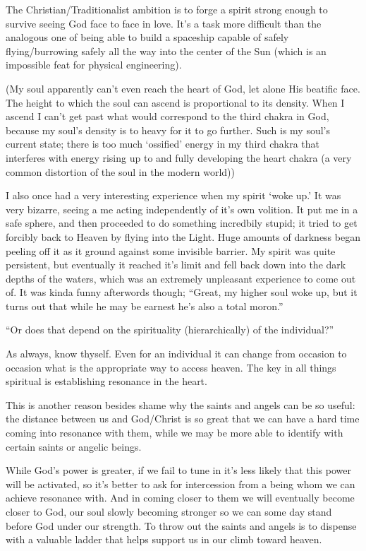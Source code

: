 \begin{footnotesize}
\begin{sffamily}
The Christian/Traditionalist ambition is to forge a spirit strong enough to survive seeing God face to face in love. It's a task more difficult than the analogous one of being able to build a spaceship capable of safely flying/burrowing safely all the way into the center of the Sun (which is an impossible feat for physical engineering).

(My soul apparently can't even reach the heart of God, let alone His beatific face. The height to which the soul can ascend is proportional to its density. When I ascend I can't get past what would correspond to the third chakra in God, because my soul's density is to heavy for it to go further. Such is my soul's current state; there is too much `ossified' energy in my third chakra that interferes with energy rising up to and fully developing the heart chakra (a very common distortion of the soul in the modern world)) 

I also once had a very interesting experience when my spirit `woke up.' It was very bizarre, seeing a me acting independently of it's own volition. It put me in a safe sphere, and then proceeded to do something incredbily stupid; it tried to get forcibly back to Heaven by flying into the Light. Huge amounts of darkness began peeling off it as it ground against some invisible barrier. My spirit was quite persistent, but eventually it reached it's limit and fell back down into the dark depths of the waters, which was an extremely unpleasant experience to come out of. It was kinda funny afterwords though; “Great, my higher soul woke up, but it turns out that while he may be earnest he's also a total moron.”

“Or does that depend on the spirituality (hierarchically) of the individual?”

As always, know thyself. Even for an individual it can change from occasion to occasion what is the appropriate way to access heaven. The key in all things spiritual is establishing resonance in the heart. 

This is another reason besides shame why the saints and angels can be so useful: the distance between us and God/Christ is so great that we can have a hard time coming into resonance with them, while we may be more able to identify with certain saints or angelic beings. 

While God's power is greater, if we fail to tune in it's less likely that this power will be activated, so it's better to ask for intercession from a being whom we can achieve resonance with. And in coming closer to them we will eventually become closer to God, our soul slowly becoming stronger so we can some day stand before God under our strength. To throw out the saints and angels is to dispense with a valuable ladder that helps support us in our climb toward heaven.



\end{sffamily}
\end{footnotesize}
